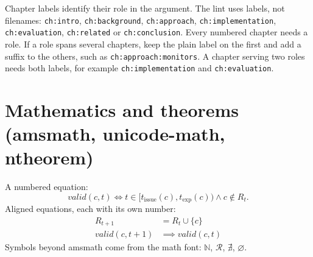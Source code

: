 Chapter labels identify their role in the argument. The lint uses labels, not filenames: \texttt{ch:intro}, \texttt{ch:background}, \texttt{ch:approach}, \texttt{ch:implementation}, \texttt{ch:evaluation}, \texttt{ch:related} or \texttt{ch:conclusion}. Every numbered chapter needs a role. If a role spans several chapters, keep the plain label on the first and add a suffix to the others, such as \texttt{ch:approach:monitors}. A chapter serving two roles needs both labels, for example \texttt{ch:implementation} and \texttt{ch:evaluation}.

\section{Mathematics and theorems (amsmath, unicode-math, ntheorem)}\label{app:latex:theorems}
A numbered equation:
\begin{equation}\label{eq:latex:window}
  \mathit{valid}(c, t) \iff t \in [t_\mathrm{issue}(c), t_\mathrm{exp}(c)) \land c \notin R_t .
\end{equation}
Aligned equations, each with its own number:
\begin{align}
  R_{t+1} &= R_t \cup \{ c \} \label{eq:latex:fresh}\\
  \mathit{valid}(c, t+1) &\implies \mathit{valid}(c, t) \label{eq:latex:valid}
\end{align}
Symbols beyond amsmath come from the math font: $\mathbb{N}$, $\mathcal{R}$, $\nexists$, $\varnothing$.

